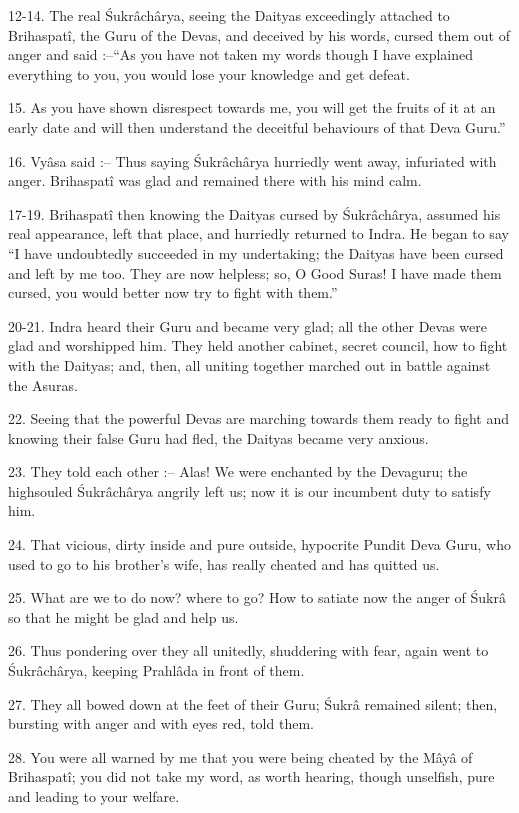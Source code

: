 12-14. The real \'Sukr\^ach\^arya, seeing the Daityas exceedingly attached to Brihaspat\^i, the Guru of the Devas, and deceived by his words, cursed them out of anger and said :--``As you have not taken my words though I have explained everything to you, you would lose your knowledge and get defeat.

15. As you have shown disrespect towards me, you will get the fruits of it at an early date and will then understand the deceitful behaviours of that Deva Guru.''

16. Vy\^asa said :-- Thus saying \'Sukr\^ach\^arya hurriedly went away, infuriated with anger. Brihaspat\^i was glad and remained there with his mind calm.

17-19. Brihaspat\^i then knowing the Daityas cursed by \'Sukr\^ach\^arya, assumed his real appearance, left that place, and hurriedly returned to Indra. He began to say ``I have undoubtedly succeeded in my undertaking; the Daityas have been cursed and left by me too. They are now helpless; so, O Good Suras! I have made them cursed, you would better now try to fight with them.''

20-21. Indra heard their Guru and became very glad; all the other Devas were glad and worshipped him. They held another cabinet, secret council, how to fight with the Daityas; and, then, all uniting together marched out in battle against the Asuras.

22. Seeing that the powerful Devas are marching towards them ready to fight and knowing their false Guru had fled, the Daityas became very anxious.

23. They told each other :-- Alas! We were enchanted by the Devaguru; the highsouled \'Sukr\^ach\^arya angrily left us; now it is our incumbent duty to satisfy him.

24. That vicious, dirty inside and pure outside, hypocrite Pundit Deva Guru, who used to go to his brother's wife, has really cheated and has quitted us.

25. What are we to do now? where to go? How to satiate now the anger of \'Sukr\^a so that he might be glad and help us.

26. Thus pondering over they all unitedly, shuddering with fear, again went to \'Sukr\^ach\^arya, keeping Prahl\^ada in front of them.

27. They all bowed down at the feet of their Guru; \'Sukr\^a remained silent; then, bursting with anger and with eyes red, told them.

28. You were all warned by me that you were being cheated by the M\^ay\^a of Brihaspat\^i; you did not take my word, as worth hearing, though unselfish, pure and leading to your welfare.

